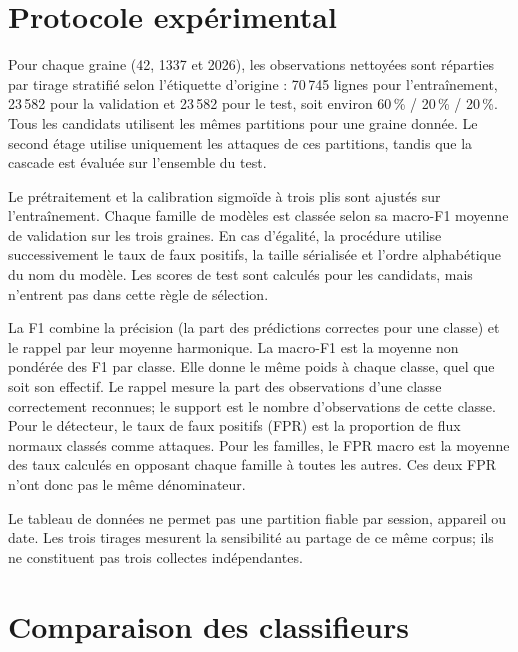 \section{Protocole exp\'erimental}

Pour chaque graine (42, 1337 et 2026), les observations nettoyées sont réparties
par tirage stratifié selon l'étiquette d'origine : 70\,745 lignes pour
l'entraînement, 23\,582 pour la validation et 23\,582 pour le test, soit environ
60\,\% / 20\,\% / 20\,\%. Tous les candidats utilisent les mêmes partitions pour
une graine donnée. Le second étage utilise uniquement les attaques de ces
partitions, tandis que la cascade est évaluée sur l'ensemble du test.

Le prétraitement et la calibration sigmoïde à trois plis sont ajustés sur
l'entraînement. Chaque famille de modèles est classée selon sa macro-F1 moyenne
de validation sur les trois graines. En cas d'égalité, la procédure utilise
successivement le taux de faux positifs, la taille sérialisée et l'ordre
alphabétique du nom du modèle. Les scores de test sont calculés pour les
candidats, mais n'entrent pas dans cette règle de sélection.

La F1 combine la précision (la part des prédictions correctes pour une classe)
et le rappel par leur moyenne harmonique. La macro-F1 est la moyenne non
pondérée des F1 par classe. Elle donne le même
poids à chaque classe, quel que soit son effectif. Le rappel mesure la part des
observations d'une classe correctement reconnues; le support est le nombre
d'observations de cette classe. Pour le détecteur, le taux de faux positifs
(FPR) est la proportion de flux normaux classés comme attaques. Pour les
familles, le FPR macro est la moyenne des taux calculés en opposant chaque
famille à toutes les autres. Ces deux FPR n'ont donc pas le même dénominateur.

Le tableau de données ne permet pas une partition fiable par session, appareil
ou date. Les trois tirages mesurent la sensibilité au partage de ce même corpus;
ils ne constituent pas trois collectes indépendantes.

\section{Comparaison des classifieurs}

